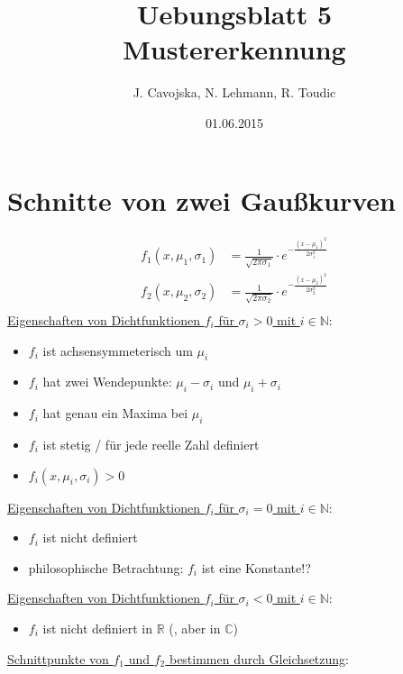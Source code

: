 \documentclass[12pt]{article}
\title{Uebungsblatt 5\\ \glqq Mustererkennung\grqq}
\author{J. Cavojska, N. Lehmann, R. Toudic}
\date{01.06.2015}
\begin{document}
\maketitle
\tableofcontents
\newpage

\section{Schnitte von zwei Gau\ss kurven}

\begin{align*}
f_1(x,\mu_1,\sigma_1) &= \frac{1}{\sqrt{2 \pi \sigma_1}} \cdot e^{-\frac{(x-\mu_1)^2}{2 \sigma_1^2}}\\
f_2(x,\mu_2,\sigma_2) &= \frac{1}{\sqrt{2 \pi \sigma_2}} \cdot e^{-\frac{(x-\mu_2)^2}{2 \sigma_2^2}}\\
\end{align*}
\underline{Eigenschaften von Dichtfunktionen $f_i$ f\"ur $\sigma_i > 0$ mit $i \in \mathbb{N}$}:
\begin{itemize}
\item $f_i$ ist achsensymmeterisch um $\mu_i$
\item $f_i$ hat zwei Wendepunkte: $\mu_i - \sigma_i$ und $\mu_i + \sigma_i$
\item $f_i$ hat genau ein Maxima bei $\mu_i$
\item $f_i$ ist stetig / f\"ur jede reelle Zahl definiert
\item $f_i(x,\mu_i,\sigma_i) > 0$
\end{itemize}
\underline{Eigenschaften von Dichtfunktionen $f_i$ f\"ur $\sigma_i = 0$ mit $i \in \mathbb{N}$}:
\begin{itemize}
\item $f_i$ ist nicht definiert
\item philosophische Betrachtung: $f_i$ ist eine Konstante!?
\end{itemize}
\underline{Eigenschaften von Dichtfunktionen $f_i$ f\"ur $\sigma_i < 0$ mit $i \in \mathbb{N}$}:
\begin{itemize}
\item $f_i$ ist nicht definiert in $\mathbb{R}$ (, aber in $\mathbb{C}$)
\end{itemize}
\newpage
\underline{Schnittpunkte von $f_1$ und $f_2$ bestimmen durch Gleichsetzung}:
\end{document}
